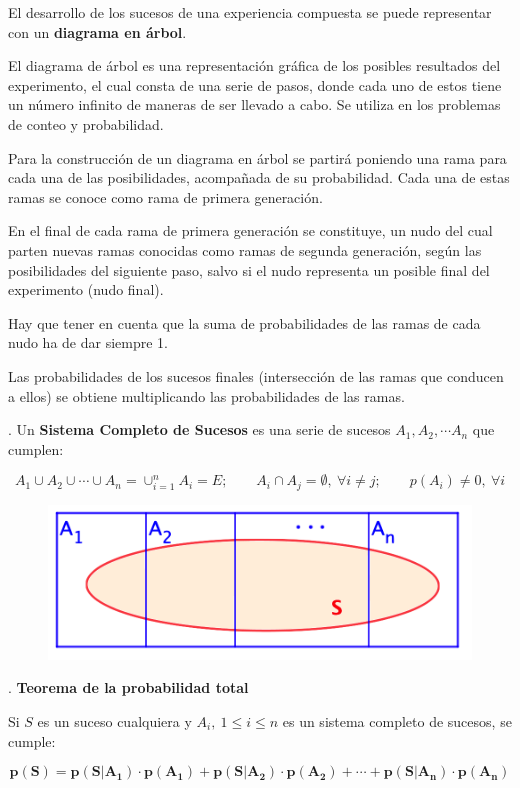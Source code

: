El desarrollo de los sucesos de una experiencia compuesta se puede representar con un \textbf{diagrama en árbol}.

El diagrama de árbol es una representación gráfica de los posibles resultados del experimento, el cual consta de una serie de pasos, donde cada uno de estos tiene un número infinito de maneras de ser llevado a cabo. Se utiliza en los problemas de conteo y probabilidad.

Para la construcción de un diagrama en árbol se partirá poniendo una rama para cada una de las posibilidades, acompañada de su probabilidad. Cada una de estas ramas se conoce como rama de primera generación.

En el final de cada rama de primera generación se constituye, un nudo del cual parten nuevas ramas conocidas como ramas de segunda generación, según las posibilidades del siguiente paso, salvo si el nudo representa un posible final del experimento (nudo final).

\begin{destacado}
Hay que tener en cuenta que la suma de probabilidades de las ramas de cada nudo ha de dar siempre 1.	
\end{destacado}

Las probabilidades de los sucesos finales (intersección de las ramas que conducen a ellos) se obtiene multiplicando las probabilidades de las ramas.

	
\begin{definition}
. Un \textbf{Sistema Completo de Sucesos} es una serie de sucesos $A_1, A_2, \cdots A_n$ que cumplen:

$$A_1\cup A_2 \cup \cdots \cup A_n=\displaystyle \cup_{i=1}^n A_i=E;\qquad A_i\cap A_j=\emptyset,\ \forall i\neq j;\qquad p(A_i)\neq 0,\ \forall i$$	

\begin{figure}[H]
			\centering
			\includegraphics[width=.6\textwidth]{imagenes/imagenes02/T02IM22.png}
	\end{figure}
\end{definition}

\begin{theorem}
.	\textbf{Teorema de la probabilidad total}	

Si $S$ es un suceso cualquiera y $A_i,\ 1\le i\le n$ es un sistema completo de sucesos, se cumple:

$$\boldsymbol{ p(S)=  p(S|A_1)\cdot p(A_1)+ p(S|A_2)\cdot p(A_2) + \cdots + p(S|A_n) \cdot p(A_n)}$$
\end{theorem}

